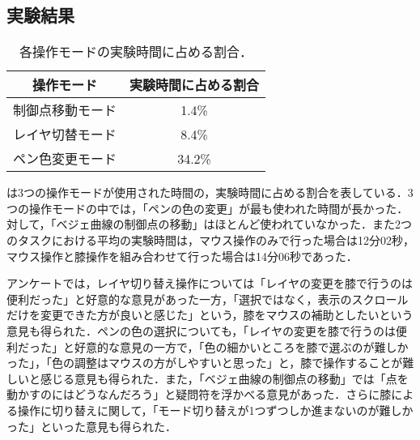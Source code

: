 \documentclass[submit, techrep]{ipsj}
\begin{document}
\subsection{実験結果}
\begin{table}[htbp]
\caption{各操作モードの実験時間に占める割合．}
\label{tb:mode_time}
\begin{tabular}{c|c}

操作モード    & 実験時間に占める割合 \\ \hline
制御点移動モード & 1.4\%      \\ 
レイヤ切替モード & 8.4\%      \\
ペン色変更モード & 34.2\%     \\ 
\end{tabular}
\end{table}
は3つの操作モードが使用された時間の，実験時間に占める割合を表している．3つの操作モードの中では，「ペンの色の変更」が最も使われた時間が長かった．対して，「ベジェ曲線の制御点の移動」はほとんど使われていなかった．また2つのタスクにおける平均の実験時間は，マウス操作のみで行った場合は12分02秒，マウス操作と膝操作を組み合わせて行った場合は14分06秒であった．\par
アンケートでは，レイヤ切り替え操作については「レイヤの変更を膝で行うのは便利だった」と好意的な意見があった一方，「選択ではなく，表示のスクロールだけを変更できた方が良いと感じた」という，膝をマウスの補助としたいという意見も得られた．ペンの色の選択についても，「レイヤの変更を膝で行うのは便利だった」と好意的な意見の一方で，「色の細かいところを膝で選ぶのが難しかった」，「色の調整はマウスの方がしやすいと思った」と，膝で操作することが難しいと感じる意見も得られた．また，「ベジェ曲線の制御点の移動」では「点を動かすのにはどうなんだろう」と疑問符を浮かべる意見があった．さらに膝による操作に切り替えに関して，「モード切り替えが1つずつしか進まないのが難しかった」といった意見も得られた．
\end{document}
